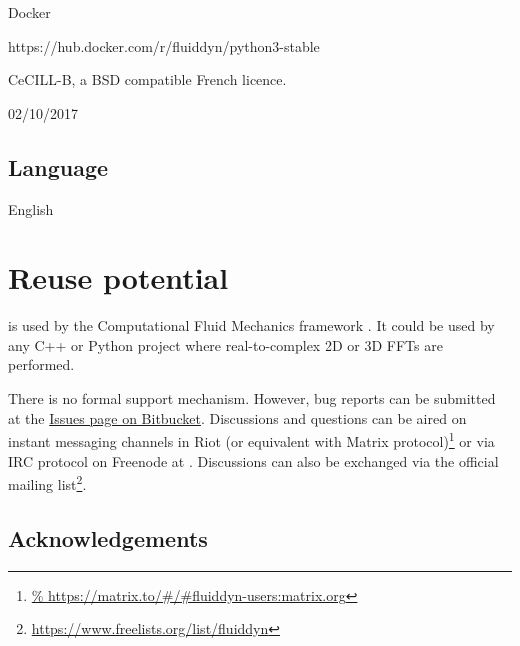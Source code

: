 \begin{description}[noitemsep,topsep=0pt]
\item[Name:] Docker
\item[Persistent identifier:] https://hub.docker.com/r/fluiddyn/python3-stable
\item[Licence:] CeCILL-B, a BSD compatible French licence.
\item[Date published:] 02/10/2017
\end{description}

\subsection{Language}


English

\section{Reuse potential}


 is used by the Computational Fluid Mechanics framework
 \citep{fluidsim}. It could be used by any C++ or Python project
where real-to-complex 2D or 3D FFTs are performed.

There is no formal support mechanism. However, bug reports can be submitted at
the \href{https://bitbucket.org/fluiddyn/fluidsim/issues}{Issues page on
Bitbucket}. Discussions and questions can be aired on instant messaging
channels in Riot (or equivalent with Matrix protocol)\footnote{
\url{%
  https://matrix.to/\#/\#fluiddyn-users:matrix.org}}
or via IRC protocol on Freenode at . Discussions
can also be exchanged via the official mailing list\footnote{
\url{https://www.freelists.org/list/fluiddyn}}.

\subsection*{Acknowledgements}

